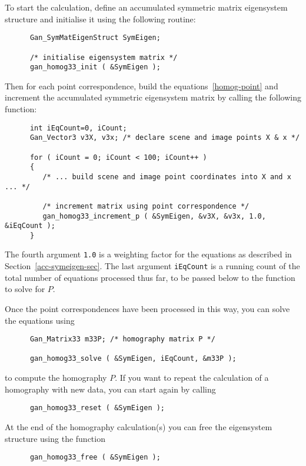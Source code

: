To start the calculation, define an accumulated symmetric matrix eigensystem
structure and initialise it using the following routine:
\begin{verbatim}
      Gan_SymMatEigenStruct SymEigen;

      /* initialise eigensystem matrix */
      gan_homog33_init ( &SymEigen );  
\end{verbatim}
Then for each point correspondence, build the equations~\ref{homog-point}
and increment the accumulated symmetric eigensystem matrix
by calling the following function:
\begin{verbatim}
      int iEqCount=0, iCount;
      Gan_Vector3 v3X, v3x; /* declare scene and image points X & x */

      for ( iCount = 0; iCount < 100; iCount++ )
      {
         /* ... build scene and image point coordinates into X and x ... */

         /* increment matrix using point correspondence */
         gan_homog33_increment_p ( &SymEigen, &v3X, &v3x, 1.0, &iEqCount );
      }
\end{verbatim}
The fourth argument {\tt 1.0} is a weighting factor for the equations as
described in Section~\ref{acc-symeigen-sec}. The last argument {\tt iEqCount}
is a running count of the total number of equations processed thus far,
to be passed below to the function to solve for $P$.

Once the point correspondences have been processed in this way,
you can solve the equations using
\begin{verbatim}
      Gan_Matrix33 m33P; /* homography matrix P */

      gan_homog33_solve ( &SymEigen, iEqCount, &m33P );
\end{verbatim}
to compute the homography $P$. If you want to repeat the calculation of
a homography with new data, you can start again by calling
\begin{verbatim}
      gan_homog33_reset ( &SymEigen );
\end{verbatim}

At the end of the homography calculation(s) you can free the eigensystem
structure using the function
\begin{verbatim}
      gan_homog33_free ( &SymEigen );
\end{verbatim}


